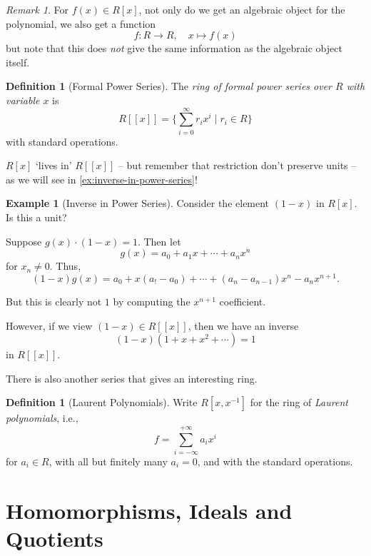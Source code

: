 \documentclass{article}
\theoremstyle{definition}
\newtheorem{definition}[theorem]{Definition}
\newtheorem{example}[theorem]{Example}
\theoremstyle{remark}
\newtheorem{remark}[theorem]{Remark}
\newcommand{\pqty}[1]{\left(#1\right)}
\newcommand{\bqty}[1]{\left[#1\right]}
\newcommand{\bbrac}[1]{[\![#1]\!]}
\newcommand{\set}[2]{\{#1\mid #2\}}
\newcommand{\function}[5]{#1:#2\to #3,\quad #4\mapsto #5}
\newcommand{\inverse}{^{-1}}
\newcommand{\plusinfty}{+\infty}
\newcommand{\minusinfty}{-\infty}
\begin{document}
\begin{remark}
    For \(f \pqty{x} \in R\bqty{x}\), not only do we get an algebraic object for the polynomial, we also get a function
    \[
        \function{f}{R}{R}{x}{f\pqty{x}}
    \]
    but note that this does \emph{not} give the same information as the algebraic object itself.
\end{remark}

\begin{definition}[Formal Power Series]
    \label{def:formal-power-series}%
    The \emph{ring of formal power series over \(R\) with variable \(x\)} is
    \[
        R \bbrac{x} = \set{\sum_{i = 0}^{\infty} r_i x^i}{r_i \in R}
    \]
    with standard operations.
\end{definition}

\(R\bqty{x}\) `lives in' \(R\bbrac{x}\) -- but remember that restriction don't preserve units -- as we will see in \autoref{ex:inverse-in-power-series}!

\begin{example}[Inverse in Power Series]
    \label{ex:inverse-in-power-series}%
    Consider the element \(\pqty{1 - x}\) in \(R\bqty{x}\). Is this a unit?

    Suppose \(g\pqty{x} \cdot \pqty{1 - x} = 1\). Then let
    \[
        g\pqty{x} = a_0 + a_1 x + \cdots + a_n x^n
    \]
    for \(x_n \neq 0\). Thus,
    \[
        \pqty{1 - x} g\pqty{x} = a_0 + x\pqty{a_! - a_0} + \cdots + \pqty{a_n - a_{n - 1}} x^n - a_n x^{n + 1}.
    \]

    But this is clearly not \(1\) by computing the \(x^{n + 1}\) coefficient.

    However, if we view \(\pqty{1 - x} \in R\bbrac{x}\), then we have an inverse
    \[
        \pqty{1 - x} \pqty{1 + x + x^2 + \cdots} = 1
    \]
    in \(R\bbrac{x}\).
\end{example}

There is also another series that gives an interesting ring.

\begin{definition}[Laurent Polynomials]
    \label{def:laurent-polynomials}%
    Write \(R\bqty{x, x\inverse}\) for the ring of \emph{Laurent polynomials}, i.e.,
    \[
        f = \sum_{i = \minusinfty}^{\plusinfty} a_i x^i
    \]
    for \(a_i \in R\), with all but finitely many \(a_i = 0\), and with the standard operations.
\end{definition}

\section{Homomorphisms, Ideals and Quotients}
\end{document}
